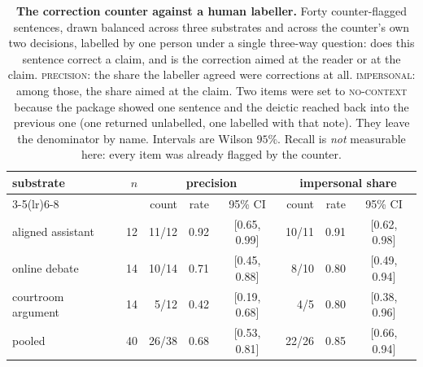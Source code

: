 \begin{table}[tb]\centering\small
\caption{\textbf{The correction counter against a human labeller.} Forty counter-flagged sentences, drawn balanced across three substrates and across the counter's own two decisions, labelled by one person under a single three-way question: does this sentence correct a claim, and is the correction aimed at the reader or at the claim. \textsc{precision}: the share the labeller agreed were corrections at all. \textsc{impersonal}: among those, the share aimed at the claim. Two items were set to \textsc{no-context} because the package showed one sentence and the deictic reached back into the previous one (one returned unlabelled, one labelled with that note). They leave the denominator by name. Intervals are Wilson $95\%$. Recall is \emph{not} measurable here: every item was already flagged by the counter.}\label{tab:humanlabels}
\begin{tabular}{lrrrcrrc}
\toprule
substrate & $n$ & \multicolumn{3}{c}{precision} & \multicolumn{3}{c}{impersonal share} \\
\cmidrule(lr){3-5}\cmidrule(lr){6-8}
 & & count & rate & 95\% CI & count & rate & 95\% CI \\
\midrule
aligned assistant & 12 & 11/12 & 0.92 & [0.65, 0.99] & 10/11 & 0.91 & [0.62, 0.98] \\
online debate & 14 & 10/14 & 0.71 & [0.45, 0.88] & 8/10 & 0.80 & [0.49, 0.94] \\
courtroom argument & 14 & 5/12 & 0.42 & [0.19, 0.68] & 4/5 & 0.80 & [0.38, 0.96] \\
\midrule
pooled & 40 & 26/38 & 0.68 & [0.53, 0.81] & 22/26 & 0.85 & [0.66, 0.94] \\
\bottomrule
\end{tabular}
\end{table}
